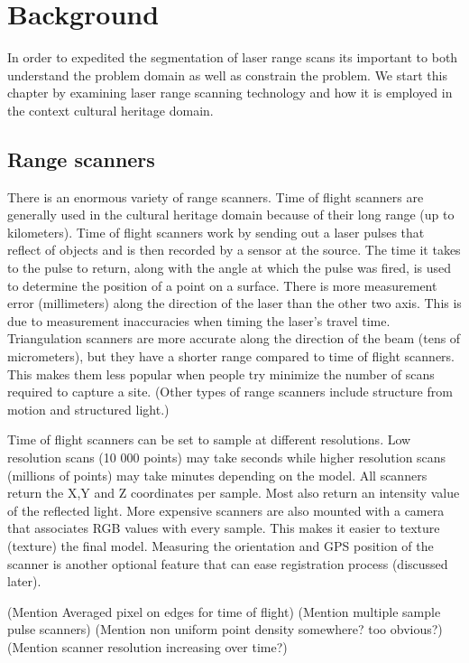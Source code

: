 \chapter{Background} \label{ch2}

In order to expedited the segmentation of laser range scans its important to both understand the problem domain as well as constrain the problem. We start this chapter by examining laser range scanning technology and how it is employed in the context cultural heritage domain.

\section{Range scanners}
	
There is an enormous variety of range scanners. Time of flight scanners are generally used in the cultural heritage domain because of their long range (up to kilometers). Time of flight scanners work by sending out a laser pulses that reflect of objects and is then recorded by a sensor at the source. The time it takes to the pulse to return, along with the angle at which the pulse was fired, is used to determine the position of a point on a surface. There is more measurement error (millimeters) along the direction of the laser than the other two axis. This is due to measurement inaccuracies when timing the laser's travel time. Triangulation scanners are more accurate along the direction of the beam (tens of micrometers), but they have a shorter range compared to time of flight scanners. This makes them less popular when people try minimize the number of scans required to capture a site. (Other types of range scanners include structure from motion and structured light.)

Time of flight scanners can be set to sample at different resolutions. Low resolution scans (10 000 points) may take seconds while higher resolution scans (millions of points) may take minutes depending on the model. All scanners return the X,Y and Z coordinates per sample. Most also return an intensity value of the reflected light. More expensive scanners are also mounted with a camera that associates RGB values with every sample. This makes it easier to texture (texture) the final model. Measuring the orientation and GPS position of the scanner is another optional feature that can ease registration process (discussed later).

(Mention Averaged pixel on edges for time of flight)
(Mention multiple sample pulse scanners)
(Mention non uniform point density somewhere? too obvious?)
(Mention scanner resolution increasing over time?)


